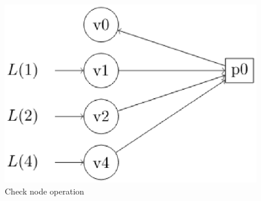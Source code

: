 \documentclass[journal,12pt,twocolumn]{IEEEtran}
\begin{document}
\begin{enumerate}
\begin{figure}[!ht]
\begin{center}
\includegraphics[width=\columnwidth]{./figs/checkope}
\end{center}
\caption{Check node operation}
\label{fig : check}
\end{figure}


\end{enumerate}
\end{document}
